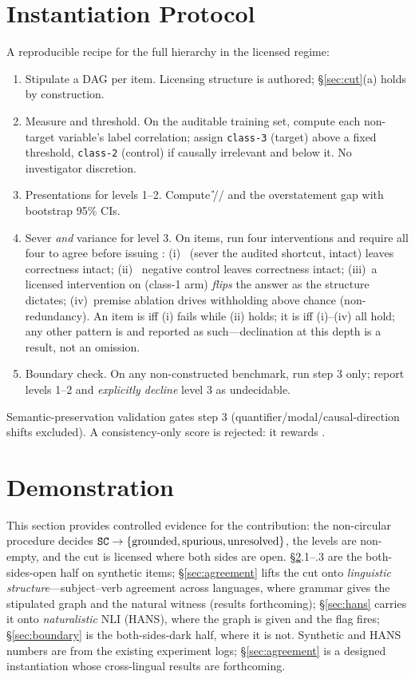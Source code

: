 \section{Instantiation Protocol}\label{sec:protocol}
A reproducible recipe for the full hierarchy in the licensed regime:
\begin{enumerate}\itemsep2pt
  \item Stipulate a DAG per item. Licensing structure \Mstr{} is
  authored; \S\ref{sec:cut}(a) holds by construction.
  \item Measure and threshold. On the auditable training set, compute
  each non-target variable's label correlation; assign \texttt{class-3} (target)
  above a fixed threshold, \texttt{class-2} (control) if causally irrelevant and
  below it. No investigator discretion.
  \item Presentations for levels 1--2. Compute \U{}/\SW{}/\SC{} and the
  overstatement gap with bootstrap 95\% CIs.
  \item Sever \emph{and} variance for level 3. On \SC{} items, run four
  interventions and require all four to agree before issuing \scg{}:
  (i)~\doc{} (sever the audited shortcut, \Mstr{} intact) leaves correctness
  intact; (ii)~\dctwo{} negative control leaves correctness intact;
  (iii)~a licensed intervention on \Mstr{} (class-1 arm) \emph{flips} the
  answer as the structure dictates; (iv)~premise ablation drives withholding
  above chance (non-redundancy). An \SC{} item is \scs{} iff (i) fails while
  (ii) holds; it is \scg{} iff (i)--(iv) all hold; any other pattern is
  \scu{} and reported as such---declination at this depth is a result, not
  an omission.
  \item Boundary check. On any non-constructed benchmark, run step 3
  only; report levels 1--2 and \emph{explicitly decline} level 3 as
  undecidable.
\end{enumerate}
Semantic-preservation validation gates step 3 (quantifier/modal/causal-direction
shifts excluded). A consistency-only score is rejected: it rewards \SW{}.

\section{Demonstration}\label{sec:demo}
This section provides controlled evidence for the contribution: the non-circular
procedure decides $\texttt{SC} \rightarrow \{\text{grounded},\text{spurious},\text{unresolved}\}$,
the levels are non-empty, and the cut is licensed where both sides are open.
\S\ref{sec:demo}.1--.3 are the both-sides-open half on synthetic items;
\S\ref{sec:agreement} lifts the cut onto \emph{linguistic structure}---subject--verb
agreement across languages, where grammar gives the stipulated graph and the
natural \scg{} witness (results forthcoming); \S\ref{sec:hans} carries it onto
\emph{naturalistic} NLI (HANS), where the graph is given and the \scs{} flag
fires; \S\ref{sec:boundary} is the both-sides-dark half, where it is not.
Synthetic and HANS numbers are from the existing experiment logs;
\S\ref{sec:agreement} is a designed instantiation whose cross-lingual results are
forthcoming.

